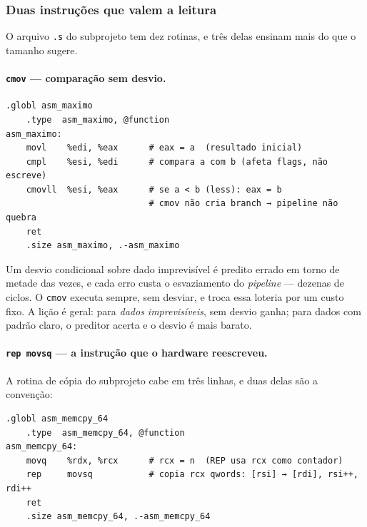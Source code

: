 \subsubsection{Duas instruções que valem a leitura}

O arquivo \texttt{.s} do subprojeto tem dez rotinas, e três delas ensinam mais
do que o tamanho sugere.

\paragraph{\texttt{cmov} --- comparação sem desvio.}

\begin{lstlisting}[style=bt, language=GAS,
    caption={\texttt{asm\_maximo} sem \emph{branch}, em
             \texttt{src/outline\_asm/asm\_funcs.s}.}]
    .globl asm_maximo
    .type  asm_maximo, @function
asm_maximo:
    movl    %edi, %eax      # eax = a  (resultado inicial)
    cmpl    %esi, %edi      # compara a com b (afeta flags, não escreve)
    cmovll  %esi, %eax      # se a < b (less): eax = b
                            # cmov não cria branch → pipeline não quebra
    ret
    .size asm_maximo, .-asm_maximo
\end{lstlisting}

Um desvio condicional sobre dado imprevisível é predito errado em torno de
metade das vezes, e cada erro custa o esvaziamento do \emph{pipeline} --- dezenas
de ciclos. O \texttt{cmov} executa sempre, sem desviar, e troca essa loteria por
um custo fixo. A lição é geral: para \emph{dados imprevisíveis}, sem desvio
ganha; para dados com padrão claro, o preditor acerta e o desvio é mais barato.

\paragraph{\texttt{rep movsq} --- a instrução que o hardware reescreveu.}
A rotina de cópia do subprojeto cabe em três linhas, e duas delas são a
convenção:

\begin{lstlisting}[style=bt, language=GAS,
    caption={\texttt{asm\_memcpy\_64}, em
             \texttt{src/outline\_asm/asm\_funcs.s}.}]
    .globl asm_memcpy_64
    .type  asm_memcpy_64, @function
asm_memcpy_64:
    movq    %rdx, %rcx      # rcx = n  (REP usa rcx como contador)
    rep     movsq           # copia rcx qwords: [rsi] → [rdi], rsi++, rdi++
    ret
    .size asm_memcpy_64, .-asm_memcpy_64
\end{lstlisting}

